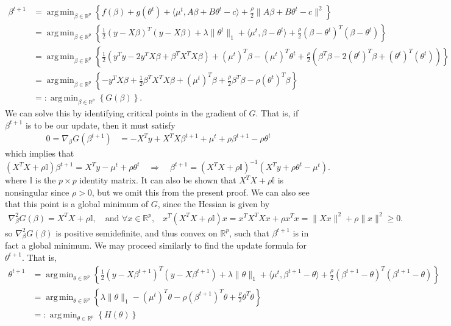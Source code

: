 \documentclass[10pt]{article}
\newcommand{\mbb}[1]{\mathbb{#1}}
\newcommand{\1}[1]{\mathbbm{1}_{#1}}
\DeclareMathOperator{\argmin}{arg\,min}
\begin{document}
    \begin{align*}
        \beta^{t+1}&=\argmin_{\beta\in\mbb{R}^p} \left\{f(\beta)+g(\theta^t)+\langle\mu^t, A\beta+B\theta^t-c\rangle+\tfrac{\rho}{2}\|A\beta+B\theta^t-c\|^2\right\}\\
        &=\argmin_{\beta\in\mbb{R}^p} \left\{\frac{1}{2}(y-X\beta)^T(y-X\beta)+\lambda\|\theta^t\|_1+\langle\mu^t,\beta-\theta^t\rangle+\tfrac{\rho}{2}(\beta-\theta^t)^T(\beta-\theta^t)\right\}\\
        &=\argmin_{\beta\in\mbb{R}^p} \left\{\frac{1}{2}(y^Ty-2y^TX\beta+\beta^TX^TX\beta)+(\mu^t)^T\beta-(\mu^t)^T\theta^t+\frac{\rho}{2}(\beta^T\beta-2(\theta^t)^T\beta+(\theta^t)^T(\theta^t))\right\}\\
        &=\argmin_{\beta\in\mbb{R}^p} \left\{-y^TX\beta+\frac{1}{2}\beta^TX^TX\beta+(\mu^t)^T\beta+\frac{\rho}{2}\beta^T\beta-\rho(\theta^t)^T\beta\right\}\\
        &=:\argmin_{\beta\in\mbb{R}^p} \left\{G(\beta)\right\}.
    \end{align*}
We can solve this by identifying critical points in the gradient of $G$. That is, if $\beta^{t+1}$ is to be our update, then it must satisfy
\begin{align*}
    0=\nabla_\beta G(\beta^{t+1})&=-X^Ty+X^TX\beta^{t+1}+\mu^t+\rho\beta^{t+1}-\rho\theta^t
\end{align*}
which implies that
\[(X^TX+\rho\mbb{I})\beta^{t+1}=X^Ty-\mu^t+\rho\theta^t\quad\Rightarrow\quad\beta^{t+1}=(X^TX+\rho\mbb{{I}})^{-1}(X^Ty+\rho\theta^t-\mu^t).\]
where $\mbb{I}$ is the $p\times p$ identity matrix. It can also be shown that $X^TX+\rho\mbb{I}$ is nonsingular since $\rho>0$, but we omit this from the present proof.
We can also see that this point is a global minimum of $G$, since the Hessian is given by
\begin{align*}
    \nabla^2_\beta G(\beta)=X^TX+\rho\mbb{I},\quad\text{and $\forall x\in\mbb{R}^p$,}\quad x^T(X^TX+\rho\mbb{I})x=x^TX^TXx+\rho x^Tx=\|Xx\|^2+\rho\|x\|^2\geq 0.
\end{align*}
so $\nabla^2_\beta G(\beta)$ is positive semidefinite, and thus convex on $\mbb{R}^p$, such that $\beta^{t+1}$ is in fact a global minimum. We may proceed similarly to find the update formula for $\theta^{t+1}$. That is,
\begin{align*}
    \theta^{t+1}&=\argmin_{\theta\in\mbb{R}^p}\left\{\frac{1}{2}(y-X\beta^{t+1})^T(y-X\beta^{t+1})+\lambda\|\theta\|_1+\langle\mu^t,\beta^{t+1}-\theta\rangle+\tfrac{\rho}{2}(\beta^{t+1}-\theta)^T(\beta^{t+1}-\theta)\right\}\\
    &=\argmin_{\theta\in\mbb{R}^p}\left\{\lambda\|\theta\|_1-(\mu^t)^T\theta-\rho(\beta^{t+1})^T\theta+\frac{\rho}{2}\theta^T\theta\right\}\tag{4}\\
    &=:\argmin_{\theta\in\mbb{R}^p}\left\{H(\theta)\right\}
\end{align*}
\end{document}
